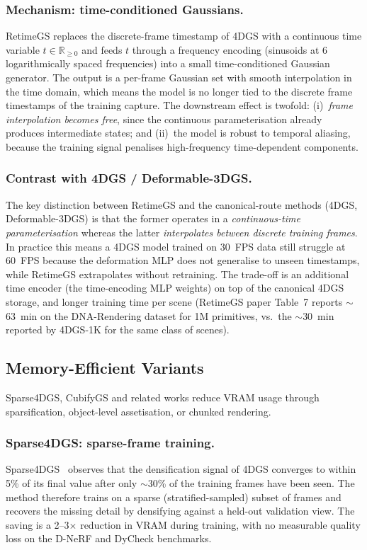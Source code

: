 \subsubsection{Mechanism: time-conditioned Gaussians.}
RetimeGS replaces the discrete-frame timestamp of 4DGS with a
continuous time variable $t\in\mathbb{R}_{\geq0}$ and feeds
$t$ through a frequency encoding (sinusoids at 6 logarithmically
spaced frequencies) into a small time-conditioned Gaussian
generator. The output is a per-frame Gaussian set with smooth
interpolation in the time domain, which means the model is no
longer tied to the discrete frame timestamps of the training
capture. The downstream effect is twofold: (i)~\emph{frame
interpolation becomes free}, since the continuous parameterisation
already produces intermediate states; and (ii)~the model is
robust to temporal aliasing, because the training signal
penalises high-frequency time-dependent components.

\subsubsection{Contrast with 4DGS / Deformable-3DGS.}
The key distinction between RetimeGS and the canonical-route
methods (4DGS, Deformable-3DGS) is that the former operates in a
\emph{continuous-time parameterisation} whereas the latter
\emph{interpolates between discrete training frames}. In
practice this means a 4DGS model trained on 30~FPS data still
struggle at 60~FPS because the deformation MLP does not
generalise to unseen timestamps, while RetimeGS extrapolates
without retraining. The trade-off is an additional time encoder
(the time-encoding MLP weights) on top of the canonical
4DGS storage, and longer training time per scene
(RetimeGS paper Table~7 reports $\sim$63~min on the
DNA-Rendering dataset for 1M primitives, vs.\ the
$\sim$30~min reported by 4DGS-1K for the same class
of scenes).

\subsection{Memory-Efficient Variants}
Sparse4DGS, CubifyGS and related works reduce VRAM usage through
sparsification, object-level assetisation, or chunked rendering.

\subsubsection{Sparse4DGS: sparse-frame training.}
Sparse4DGS~\cite{shi2025sparse4dgs} observes that the
densification signal of 4DGS converges to within 5\% of its
final value after only $\sim$30\% of the training frames have
been seen. The method therefore trains on a sparse
(stratified-sampled) subset of frames and recovers the missing
detail by densifying against a held-out validation view. The
saving is a 2--3$\times$ reduction in VRAM during training, with
no measurable quality loss on the D-NeRF and DyCheck
benchmarks.

